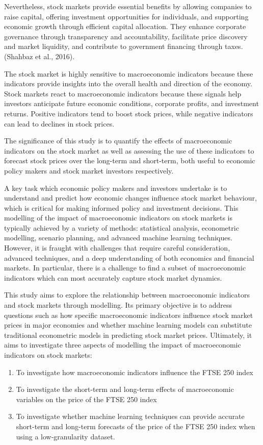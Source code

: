 \documentclass[11pt,a4paper]{article}
\begin{document}
Nevertheless, stock markets provide essential benefits by allowing companies to raise capital, offering investment opportunities for individuals, and supporting economic growth through efficient capital allocation. They enhance corporate governance through transparency and accountability, facilitate price discovery and market liquidity, and contribute to government financing through taxes.(Shahbaz et al., 2016). 

The stock market is highly sensitive to macroeconomic indicators because these indicators provide insights into the overall health and direction of the economy. Stock markets react to macroeconomic indicators because these signals help investors anticipate future economic conditions, corporate profits, and investment returns. Positive indicators tend to boost stock prices, while negative indicators can lead to declines in stock prices.

The significance of this study is to quantify the effects of macroeconomic indicators on the stock market as well as assessing the use of these indicators to forecast stock prices over the long-term and short-term, both useful to economic policy makers and stock market investors respectively.

A key task which economic policy makers and investors undertake is to understand and predict how economic changes influence stock market behaviour, which is critical for making informed policy and investment decisions. This modelling of the impact of macroeconomic indicators on stock markets is typically achieved by a variety of methods: statistical analysis, econometric modelling, scenario planning, and advanced machine learning techniques. However, it is fraught with challenges that require careful consideration, advanced techniques, and a deep understanding of both economics and financial markets. In particular, there is a challenge to find a subset of macroeconomic indicators which can most accurately capture stock market dynamics. 

This study aims to explore the relationship between macroeconomic indicators and stock markets 
through modelling. Its primary objective is to address questions such as how specific 
macroeconomic indicators influence stock market prices in major economies and whether machine 
learning models can substitute traditional econometric models in predicting stock market prices. 
Ultimately, it aims to investigate three aspects of modelling the impact of macroeconomic 
indicators on stock markets: 
\begin{enumerate}
    \item To investigate how macroeconomic indicators influence the FTSE 250 index
    \item To investigate the short-term and long-term effects of macroeconomic variables on the price of the FTSE 250 index
    \item To investigate whether machine learning techniques can provide accurate short-term and long-term forecasts of the price of the FTSE 250 index when using a low-granularity dataset.
   
\end{enumerate}
\end{document}
